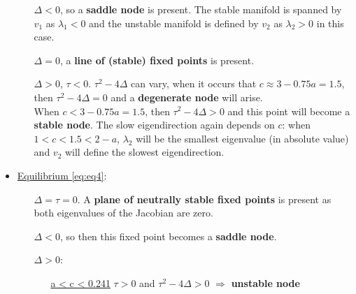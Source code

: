 \documentclass[a4paper,11pt]{article}
\begin{document}
\begin{itemize}
\begin{itemize}
			\item[\boxed{\textbf{0<c<1}}  ] $\Delta<0$, so a \textbf{saddle node} is present. The stable manifold is spanned by $v_1$ as $\lambda_1<0$ and the unstable manifold is defined
			by $v_2$ as $\lambda_2>0$ in this case.
   			\item[\boxed{\mathbf{c\approx 1}}  ] $\Delta=0$, a \textbf{line of (stable) fixed points} is present.
      		\item[\boxed{\textbf{c>1}}  ] $\Delta>0$, $\tau<0$. $\tau^2-4\Delta$ can vary, when it occurs that $c\approx 3-0.75a=1.5$, then $\tau^2-4\Delta=0$ and a 
			  \textbf{degenerate node} will arise. \\ When $c<3-0.75a=1.5$, then $\tau^2-4\Delta>0$ and this point will become a \textbf{stable node}. The slow eigendirection again depends on $c$:
			  when $1<c<1.5<2-a$, $\lambda_2$ will be the smallest eigenvalue (in absolute value) and $v_2$ will define the slowest eigendirection.\\
		\end{itemize}
	\item \underline{Equilibrium \eqref{eq:eq4}}: \\
		\begin{itemize}
			\item[\boxed{\mathbf{c\approx0}}  ] $\Delta=\tau=0$. A \textbf{plane of neutrally stable fixed points} is present as both eigenvalues of the Jacobian are zero.
   			\item[\boxed{\textbf{0<c<a}\; \& \;\textbf{c>1}}  ] $\Delta<0$, so then this fixed point becomes a \textbf{saddle node}.
      		\item[\boxed{\textbf{a<c<1}}  ] $\Delta>0$: \begin{itemize}[leftmargin=20mm]
															\item[\underline{a < c < 0.241}] $\tau>0$ and $\tau^2-4\Delta>0$ $\Rightarrow$ \textbf{unstable node}\\

\end{itemize}
\end{itemize}
\end{itemize}
\end{document}
